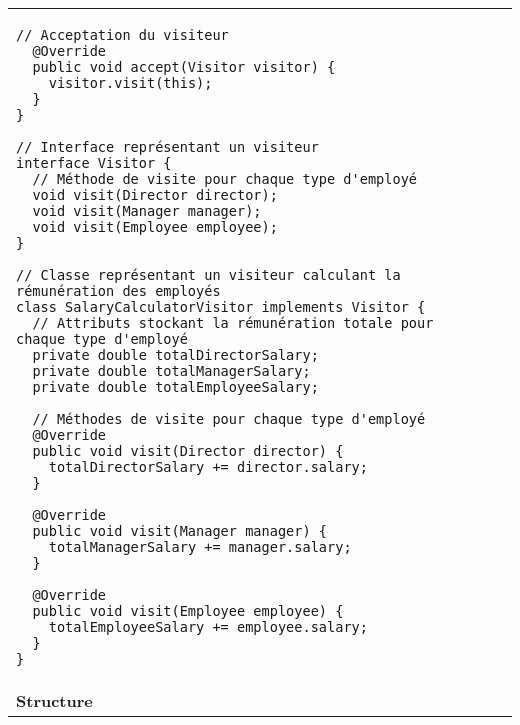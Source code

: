 \begin{minipage}[t]{1\textwidth}
\begin{table}[H]
\begin{adjustbox}{max width=\textwidth}
\begin{tabular}{l|p{\textwidth}}
\begin{minipage}[tr]{0.5\textwidth}
\begin{lstlisting}[style=monstyle]
  // Acceptation du visiteur
  @Override
  public void accept(Visitor visitor) {
    visitor.visit(this);
  }
}

// Interface représentant un visiteur
interface Visitor {
  // Méthode de visite pour chaque type d'employé
  void visit(Director director);
  void visit(Manager manager);
  void visit(Employee employee);
}

// Classe représentant un visiteur calculant la rémunération des employés
class SalaryCalculatorVisitor implements Visitor {
  // Attributs stockant la rémunération totale pour chaque type d'employé
  private double totalDirectorSalary;
  private double totalManagerSalary;
  private double totalEmployeeSalary;

  // Méthodes de visite pour chaque type d'employé
  @Override
  public void visit(Director director) {
    totalDirectorSalary += director.salary;
  }

  @Override
  public void visit(Manager manager) {
    totalManagerSalary += manager.salary;
  }

  @Override
  public void visit(Employee employee) {
    totalEmployeeSalary += employee.salary;
  }
}
\end{lstlisting}
\end{minipage}
\\
\cmidrule(lr){1-2}

\textbf{Structure} & 

\\
\bottomrule
\end{tabular}
\end{adjustbox}
\end{table}
\end{minipage}


\newpage
